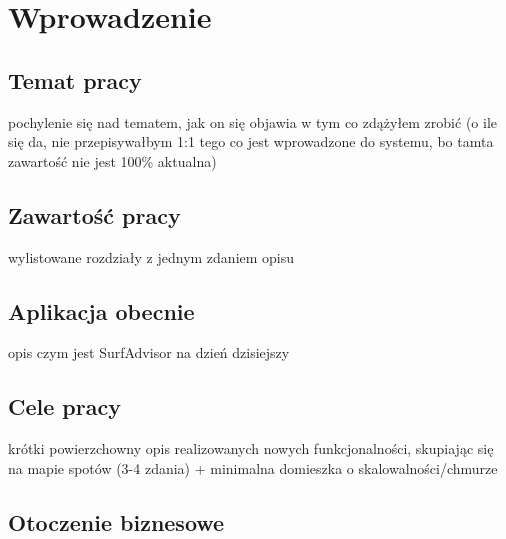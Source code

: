 \chapter{Wprowadzenie}
\label{cha:intro}

\section{Temat pracy}
pochylenie się nad tematem, jak on się objawia w tym co zdążyłem zrobić 
(o ile się da, nie przepisywałbym 1:1 tego co jest wprowadzone do systemu, bo tamta zawartość nie jest 100\% aktualna)

\section{Zawartość pracy}
wylistowane rozdziały z jednym zdaniem opisu

\section{Aplikacja obecnie}
opis czym jest SurfAdvisor na dzień dzisiejszy

\section{Cele pracy}
krótki powierzchowny opis realizowanych nowych funkcjonalności, 
skupiając się na mapie spotów (3-4 zdania) + minimalna domieszka o skalowalności/chmurze

\section{Otoczenie biznesowe}